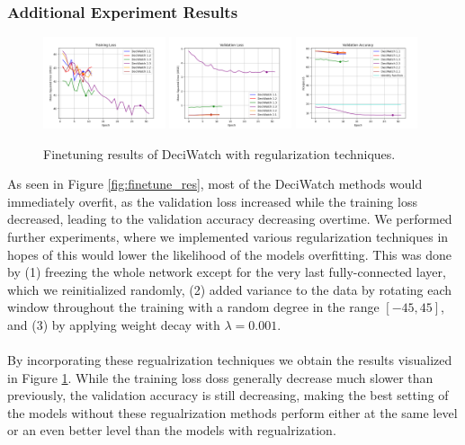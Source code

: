\documentclass[./main.tex]{subfiles}
\begin{document}
\subsubsection{Additional Experiment Results}
\label{sec:finetune_additional_experiment}
\begin{figure}
    \centering
    \includegraphics[width=0.32\textwidth]{./entities/finetuned/adapted/train_losses.png}
    \includegraphics[width=0.32\textwidth]{./entities/finetuned/adapted/val_losses.png}
    \includegraphics[width=0.32\textwidth]{./entities/finetuned/adapted/val_accs.png}
    \caption{Finetuning results of DeciWatch with regularization techniques.}
    \label{fig:finetune_res_2}
\end{figure}
As seen in Figure \ref{fig:finetune_res}, most of the DeciWatch methods would immediately overfit, as the validation loss increased while the training loss decreased, leading to the validation accuracy decreasing overtime. We performed further experiments, where we implemented various regularization techniques in hopes of this would lower the likelihood of the models overfitting. This was done by (1) freezing the whole network except for the very last fully-connected layer, which we reinitialized randomly, (2) added variance to the data by rotating each window throughout the training with a random degree in the range $[-45, 45]$, and (3) by applying weight decay with $\lambda = 0.001$.
\\
\\
By incorporating these regualrization techniques we obtain the results visualized in Figure \ref{fig:finetune_res_2}. While the training loss doss generally decrease much slower than previously, the validation accuracy is still decreasing, making the best setting of the models without these regualrization methods perform either at the same level or an even better level than the models with regualrization.
\end{document}
